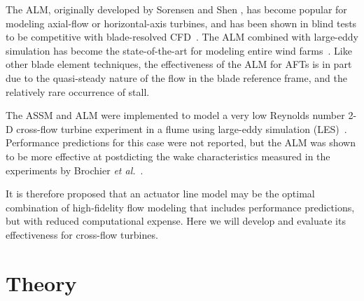 The ALM, originally developed by Sorensen and Shen \cite{Sorensen2002}, has
become popular for modeling axial-flow or horizontal-axis turbines, and has been
shown in blind tests to be competitive with blade-resolved
CFD~\cite{Krogstad2013, Pierella2014}. The ALM combined with large-eddy
simulation has become the state-of-the-art for modeling entire wind
farms~\cite{Archer2013, Churchfield2012, Sorensen2015, Fleming2013,
    Fleming2014}. Like other blade element techniques, the effectiveness of the ALM
for AFTs is in part due to the quasi-steady nature of the flow in the blade
reference frame, and the relatively rare occurrence of stall.

The ASSM and ALM were implemented to model a very low Reynolds number 2-D
cross-flow turbine experiment in a flume using large-eddy simulation
(LES)~\cite{Shamsoddin2014}. Performance predictions for this case were not
reported, but the ALM was shown to be more effective at postdicting the wake
characteristics measured in the experiments by Brochier \emph{et
    al.}~\cite{Brochier1986}.

It is therefore proposed that an actuator line model may be the optimal
combination of high-fidelity flow modeling that includes performance
predictions, but with reduced computational expense. Here we will develop and
evaluate its effectiveness for cross-flow turbines.


\section{Theory}

